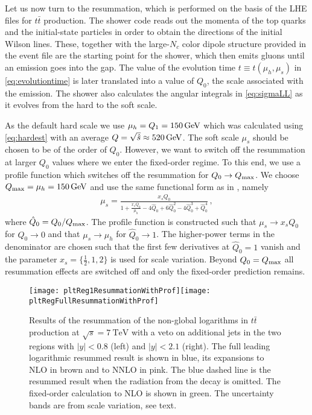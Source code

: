 \documentclass[11pt,a4paper]{article}
\begin{document}
Let us now turn to the resummation, which is performed on the basis of the LHE files for $t\bar{t}$ production. The shower code reads out the momenta of the top quarks and the initial-state particles in order to obtain the directions of the initial Wilson lines. These, together with the large-$N_c$ color dipole structure provided in the event file are the starting point for the shower, which then emits gluons until an emission goes into the gap. The value of the evolution time $t\equiv t(\mu_h,\mu_s)$ in \eqref{eq:evolutiontime}  is later translated into a value of $Q_0$, the scale associated with the emission. The shower also calculates the angular integrals in \eqref{eq:sigmaLL} as it evolves from the hard to the soft scale.

As the default hard scale we use $\mu_h=Q_1=150\,{\rm GeV}$ which was calculated using \eqref{eq:hardest} with an average $Q=\sqrt{\hat{s}}\approx520\,{\rm GeV}$. The soft scale $\mu_s$ should be chosen to be of the order of $Q_0$. However, we want to switch off the resummation at larger $Q_0$ values where we enter the fixed-order regime. To this end, we use a profile function which switches off the resummation for $Q_0 \to Q_{\rm max}$. We choose $Q_{\rm max} = \mu_h = 150\,{\rm GeV}$ and use the same functional form as in \cite{Balsiger:2019tne}, namely
\begin{align}
\mu_{s}=\frac{x_s Q_0}{1 + \frac{x_s Q_0}{\mu_h} - 4 \hat{Q}_0 +6 \hat{Q}_0^2  - 4 \hat{Q}_0^3 +\hat{Q}_0^4}\, , \label{eq:profFun}
\end{align}
where $\hat{Q}_0 = Q_0/Q_{\rm max}$. The profile function is constructed such  that $\mu_s\to x_s Q_0$ for $Q_0 \to 0$ and that $\mu_s\to \mu_h$ for $\hat{Q}_0 \to 1$. The higher-power terms in the denominator are chosen such that the first few derivatives at $\hat{Q}_0 = 1$ vanish and the parameter $x_s=\{\frac{1}{2},1,2\}$ is used for scale variation. Beyond $Q_0=Q_{\rm max}$ all resummation effects are switched off and only the fixed-order prediction remains.

\begin{figure}[t]
	\centering
	\texttt{[image: pltReg1ResummationWithProf]}\texttt{[image: pltRegFullResummationWithProf]}
	\caption{Results of the resummation of the non-global logarithms in $t\bar{t}$ production at $\sqrt{s} = 7~\text{TeV}$ with a veto on additional jets in the two regions with $|y| < 0.8$ (left) and $|y| < 2.1$ (right). 
			The full leading logarithmic resummed result is shown in  blue, its expansions to NLO in brown and to NNLO in pink. The blue dashed line is the  resummed result when the radiation from the decay is omitted. The fixed-order calculation to NLO is shown in green. The uncertainty bands are from scale variation, see text. \label{fig:resummationResults}}
	\end{figure}
\end{document}
